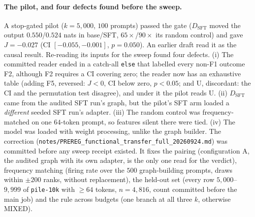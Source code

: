 \documentclass{article}
\begin{document}
\paragraph{The pilot, and four defects found before the sweep.} A stop-gated pilot ($k=5{,}000$, $100$ prompts) passed the gate ($D_{\mathrm{SFT}}$ moved the output $0.550$/$0.524$ nats in base/SFT, $65\times$/$90\times$ its random control) and gave $J=-0.027$ (CI $[-0.055,-0.001]$, $p=0.050$). An earlier draft read it as the causal result. Re-reading its inputs for the sweep found four defects. (i) The committed reader ended in a catch-all \texttt{else} that labelled every non-F1 outcome F2, although F2 requires a CI covering zero; the reader now has an exhaustive table (adding F5, reversed: $J<0$, CI below zero, $p<0.05$; and U, discordant: the CI and the permutation test disagree), and under it the pilot reads U. (ii) $D_{\mathrm{SFT}}$ came from the audited SFT run's graph, but the pilot's SFT arm loaded a \emph{different} seeded SFT run's adapter. (iii) The random control was frequency-matched on one $64$-token prompt, so features silent there were tied. (iv) The model was loaded with weight processing, unlike the graph builder. The correction (\texttt{notes/PREREG\_functional\_transfer\_full\_20260924.md}) was committed before any sweep receipt existed. It fixes the pairing (configuration A, the audited graph with its own adapter, is the only one read for the verdict), frequency matching (firing rate over the $500$ graph-building prompts, draws within $\pm200$ ranks, without replacement), the held-out set (every row $5{,}000$--$9{,}999$ of \texttt{pile-10k} with $\ge64$ tokens, $n=4{,}816$, count committed before the main job) and the rule across budgets (one branch at all three $k$, otherwise MIXED).
\end{document}
